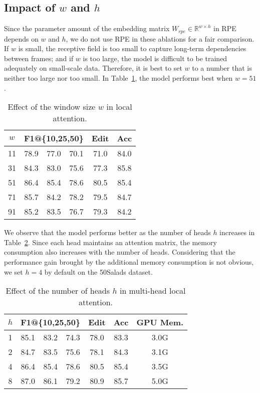 \documentclass[letterpaper]{article} \usepackage[submission]{aaai23}  \usepackage{times}  \usepackage{helvet}  \usepackage{courier}  \usepackage[hyphens]{url}  \usepackage{graphicx} \urlstyle{rm} \def\UrlFont{\rm}  \usepackage{natbib}  \usepackage{caption} \frenchspacing  \setlength{\pdfpagewidth}{8.5in} \setlength{\pdfpageheight}{11in} \usepackage{algorithm}
\begin{document}
\subsection{Impact of \(w\) and \(h\)}
Since the parameter amount of the embedding matrix $W_{rpe}\in\mathbb{R}^{w\times h}$ in RPE depends on $w$ and $h$, we do not use RPE in these ablations for a fair comparison. If $w$ is small, the receptive field is too small to capture long-term dependencies between frames; and if $w$ is too large, the model is difficult to be trained adequately on small-scale data. Therefore, it is best to set $w$ to a number that is neither too large nor too small. In Table~\ref{tab:w}, the model performs best when $w=51$. 

\begin{table}[ht]
\centering
\begin{tabular}{cccccc}
    \toprule
    $w$    & \multicolumn{3}{c}{F1@\{10,25,50\}} & Edit & Acc\\
    \midrule
    11 & 78.9 & 77.0 & 70.1 & 71.0 & 84.0\\
    31 & 84.3 & 83.0 & 75.6 & 77.3 & 85.8\\
    51 & 86.4 & 85.4 & 78.6 & 80.5 & 85.4\\
    71 & 85.7 & 84.2 & 78.2 & 79.5 & 84.7\\
    91 & 85.2 & 83.5 & 76.7 & 79.3 & 84.2\\
    \bottomrule
\end{tabular}
\caption{Effect of the window size $w$ in local attention.}
\label{tab:w}
\end{table}

We observe that the model performs better as the number of heads $h$ increases in Table~\ref{tab:h}. Since each head maintains an attention matrix, the memory consumption also increases with the number of heads. Considering that the performance gain brought by the additional memory consumption is not obvious, we set $h=4$ by default on the 50Salads dataset.

\begin{table}[ht]
\centering
\begin{tabular}{ccccccc}
    \toprule
    $h$    & \multicolumn{3}{c}{F1@\{10,25,50\}} & Edit & Acc & GPU Mem.\\
    \midrule
    1 & 85.1 & 83.2 & 74.3 & 78.0 & 83.3 & 3.0G\\
    2 & 84.7 & 83.5 & 75.6 & 78.1 & 84.3 & 3.1G\\
    4 & 86.4 & 85.4 & 78.6 & 80.5 & 85.4 & 3.5G\\
    8 & 87.0 & 86.1 & 79.2 & 80.9 & 85.7 & 5.0G\\
    \bottomrule
\end{tabular}
\caption{Effect of the number of heads $h$ in multi-head local attention.}
\label{tab:h}
\end{table}
\end{document}
